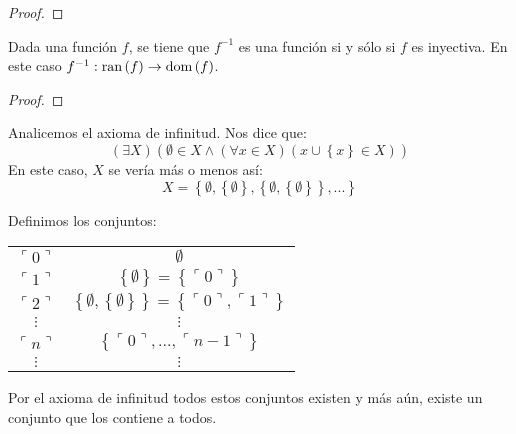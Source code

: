 \documentclass[12pt]{report}
\newcounter{it}
\theoremstyle{largebreak}
\newcommand\cf[3]{\ensuremath{#1:#2\rightarrow#3}}
\newcommand\dom[1]{\ensuremath{\textup{dom}\left(#1\right)}}
\newcommand\ran[1]{\ensuremath{\textup{ran}\left(#1\right)}}
\newcommand{\winecomma}[1]{\ensuremath{\ulcorner#1\urcorner}}
\begin{document}
    \begin{proof}
        
    \end{proof}

    \begin{cor}
        Dada una función $f$, se tiene que $f^{-1}$ es una función si y sólo si $f$ es inyectiva. En este caso $\cf{f^{-1}}{\ran{f}}{\dom{f}}$.
    \end{cor}

    \begin{proof}
        
    \end{proof}

    Analicemos el axioma de infinitud. Nos dice que:
    \begin{equation*}
        (\exists X)(\emptyset \in X\land(\forall x\in X)(x\cup\left\{x \right\}\in X))
    \end{equation*}
    En este caso, $X$ se vería más o menos así:
    \begin{equation*}
        X=\left\{\emptyset,\left\{\emptyset \right\},\left\{\emptyset,\left\{\emptyset \right\}\right\},...\right\}
    \end{equation*}

    \begin{mydef}
        Definimos los conjuntos:
        \begin{center}
            \begin{tabular}{cc}
                $\winecomma{0}$ & $\emptyset$ \\
                $\winecomma{1}$ & $\left\{\emptyset\right\}=\left\{\winecomma{0}\right\}$ \\
                $\winecomma{2}$ & $\left\{\emptyset,\left\{\emptyset\right\}\right\}=\left\{\winecomma{0},\winecomma{1}\right\}$ \\
                $\vdots$ & $\vdots$ \\
                $\winecomma{n}$ & $\left\{\winecomma{0},...,\winecomma{n-1} \right\}$ \\
                $\vdots$ & $\vdots$ \\
            \end{tabular}
        \end{center}
    \end{mydef}

    \begin{obs}
        Por el axioma de infinitud todos estos conjuntos existen y más aún, existe un conjunto que los contiene a todos.
    \end{obs}
\end{document}
